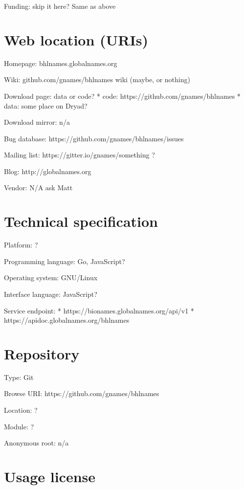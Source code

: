 \documentclass[
]{article}
\begin{document}
Funding: skip it here? Same as above

\hypertarget{web-location-uris}{%
\section{Web location (URIs)}\label{web-location-uris}}

Homepage: bhlnames.globalnames.org

Wiki: github.com/gnames/bhlnames wiki (maybe, or nothing)

Download page: data or code? * code: https://github.com/gnames/bhlnames
* data: some place on Dryad?

Download mirror: n/a

Bug database: https://github.com/gnames/bhlnames/issues

Mailing list: https://gitter.io/gnames/something ?

Blog: http://globalnames.org

Vendor: N/A ask Matt

\hypertarget{technical-specification}{%
\section{Technical specification}\label{technical-specification}}

Platform: ?

Programming language: Go, JavaScript?

Operating system: GNU/Linux

Interface language: JavaScript?

Service endpoint: * https://bionames.globalnames.org/api/v1 *
https://apidoc.globalnames.org/bhlnames

\hypertarget{repository}{%
\section{Repository}\label{repository}}

Type: Git

Browse URI: https://github.com/gnames/bhlnames

Location: ?

Module: ?

Anonymous root: n/a

\hypertarget{usage-license}{%
\section{Usage license}\label{usage-license}}
\end{document}

